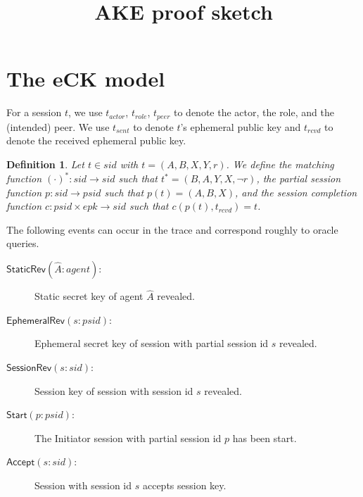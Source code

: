 \documentclass[]{article}
\newtheorem{definition}{Definition}
\begin{document}
\title{AKE proof sketch}
\author{}
\maketitle

\newcommand{\tr}{\mathit{tr}}

\newcommand{\StaticRev}{\mathsf{StaticRev}}
\newcommand{\EphemeralRev}{\mathsf{EphemeralRev}}
\newcommand{\SessionRev}{\mathsf{SessionRev}}
\newcommand{\Start}{\mathsf{Start}}
\newcommand{\Accept}{\mathsf{Accept}}
\newcommand{\Init}{\mathsf{Init_1}}
\newcommand{\Initt}{\mathsf{Init_2}}
\newcommand{\Resp}{\mathsf{Resp}}

\newcommand{\HasMatching}{\mathsf{HasMatching}}

\newcommand{\psid}{\mathit{psid}}
\newcommand{\sid}{\mathit{sid}}
\newcommand{\agent}{\mathit{agent}}
\newcommand{\epk}{\mathit{epk}}
\newcommand{\esk}{\mathit{esk}}

\newcommand{\actor}[1]{#1_{\mathit{actor}}}
\newcommand{\role}[1]{#1_{\mathit{role}}}
\newcommand{\peer}[1]{#1_{\mathit{peer}}}
\newcommand{\sent}[1]{#1_{\mathit{sent}}}
\newcommand{\rcvd}[1]{#1_{\mathit{rcvd}}}
\newcommand{\fresh}{\mathit{fresh}}

\section{The eCK model}

For a session $t$, we use $\actor{t}$, $\role{t}$, $\peer{t}$ to denote the
  actor, the role, and the (intended) peer.
We use $\sent{t}$ to denote $t$'s ephemeral public key and $\rcvd{t}$ to denote
  the received ephemeral public key.

\begin{definition}
Let $t\in \sid$ with $t=(A,B,X,Y,r)$.
We define the matching function $(\cdot)^{*} : \sid \to \sid$
  such that $t^* = (B,A,Y,X, \neg r)$,
  the partial session function $p : \sid \to \psid$ such that
  $p(t) = (A,B,X)$,
  and the session completion function
  $c : \psid \times \epk \to \sid$ such that $c(p(t), \rcvd{t}) = t$.
\end{definition}

The following events can occur in the trace and correspond roughly to oracle queries.
\begin{description}
\item[$\StaticRev(\hat{A} : \agent)$:] Static secret key of agent $\hat{A}$ revealed.
\item[$\EphemeralRev(s : \psid)$:] Ephemeral secret key of session with partial session
  id $s$ revealed.
\item[$\SessionRev(s : \sid)$:] Session key of session with session id $s$ revealed.
\item[$\Start(p : \psid)$:] The Initiator session with partial session id $p$ has
  been start.
\item[$\Accept(s : \sid)$:] Session with session id $s$ accepts session key.
\end{description}
\end{document}
